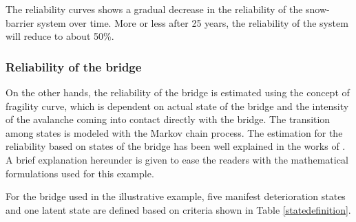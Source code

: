 \documentclass[fleqn]{article}
\begin{document}
The reliability curves shows a gradual decrease in the reliability of the snow-barrier system over time. More or less after 25 years, the reliability of the system will reduce to about 50\%. 

\subsubsection{Reliability of the bridge}
On the other hands, the reliability of the bridge is estimated using the concept of fragility curve, which is dependent on actual state of the bridge and the intensity of the avalanche coming into contact directly with the bridge. The transition among states is modeled with the Markov chain process. The estimation for the reliability based on states of the bridge has been well explained in the works of \citep{Lethanh2015,Fernando2015}. A brief explanation hereunder is given to ease the readers with the mathematical formulations used for this example.

For the bridge used in the illustrative example, five manifest deterioration states and one latent state are defined based on criteria shown in Table \ref{statedefinition}. 
\end{document}
